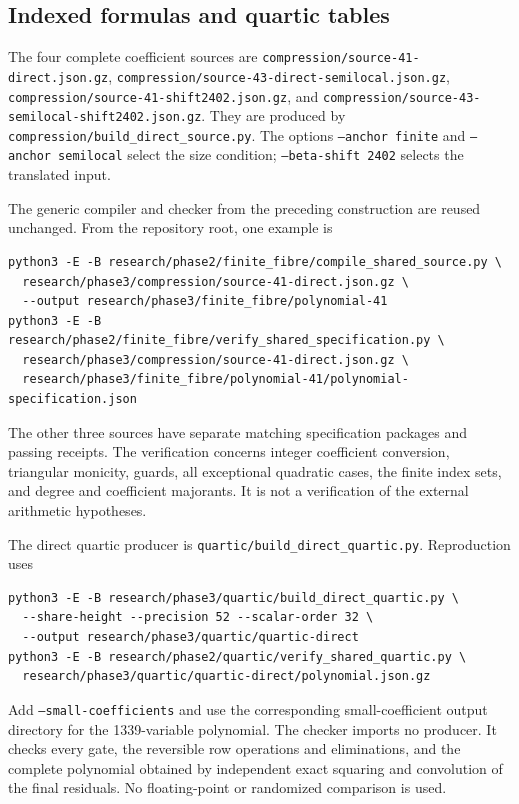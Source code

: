 \documentclass[11pt]{article}
\theoremstyle{definition}
\begin{document}
\subsection{Indexed formulas and quartic tables}

The four complete coefficient sources are
\nolinkurl{compression/source-41-direct.json.gz},
\nolinkurl{compression/source-43-direct-semilocal.json.gz},
\nolinkurl{compression/source-41-shift2402.json.gz}, and
\nolinkurl{compression/source-43-semilocal-shift2402.json.gz}.
They are produced by \nolinkurl{compression/build_direct_source.py}.
The options \texttt{--anchor finite} and
\texttt{--anchor semilocal} select the size condition;
\texttt{--beta-shift 2402} selects the translated input.

The generic compiler and checker from the preceding construction
are reused unchanged. From the repository root, one example is
\begin{verbatim}
python3 -E -B research/phase2/finite_fibre/compile_shared_source.py \
  research/phase3/compression/source-41-direct.json.gz \
  --output research/phase3/finite_fibre/polynomial-41
python3 -E -B research/phase2/finite_fibre/verify_shared_specification.py \
  research/phase3/compression/source-41-direct.json.gz \
  research/phase3/finite_fibre/polynomial-41/polynomial-specification.json
\end{verbatim}
The other three sources have separate matching specification packages
and passing receipts. The verification concerns integer coefficient
conversion, triangular monicity, guards, all exceptional quadratic
cases, the finite index sets, and degree and coefficient majorants.
It is not a verification of the external arithmetic hypotheses.

The direct quartic producer is
\nolinkurl{quartic/build_direct_quartic.py}. Reproduction uses
\begin{verbatim}
python3 -E -B research/phase3/quartic/build_direct_quartic.py \
  --share-height --precision 52 --scalar-order 32 \
  --output research/phase3/quartic/quartic-direct
python3 -E -B research/phase2/quartic/verify_shared_quartic.py \
  research/phase3/quartic/quartic-direct/polynomial.json.gz
\end{verbatim}
Add \texttt{--small-coefficients} and use the corresponding
small-coefficient output directory for the 1339-variable polynomial.
The checker imports no producer. It checks every gate, the reversible
row operations and eliminations, and the complete polynomial obtained
by independent exact squaring and convolution of the final residuals.
No floating-point or randomized comparison is used.
\end{document}
